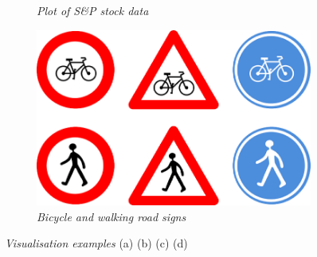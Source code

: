 \begin{figure}[!htb]
\begin{subfigure}{.5\textwidth}
  \caption{\emph{Plot of S\&P stock data} }
\end{subfigure}%
\begin{subfigure}{.5\textwidth}
  \centering
  \includegraphics[scale=.25]{roadsigns.png}
  \caption{\emph{Bicycle and walking road signs} }
\end{subfigure}
\caption{\textit{Visualisation examples} (a)\citep{tubemap} (b)\citep{weather} (c)\citep{stockmarket}  (d)\citep{roadsigns}}
\label{fig:visualisations}
\end{figure}


